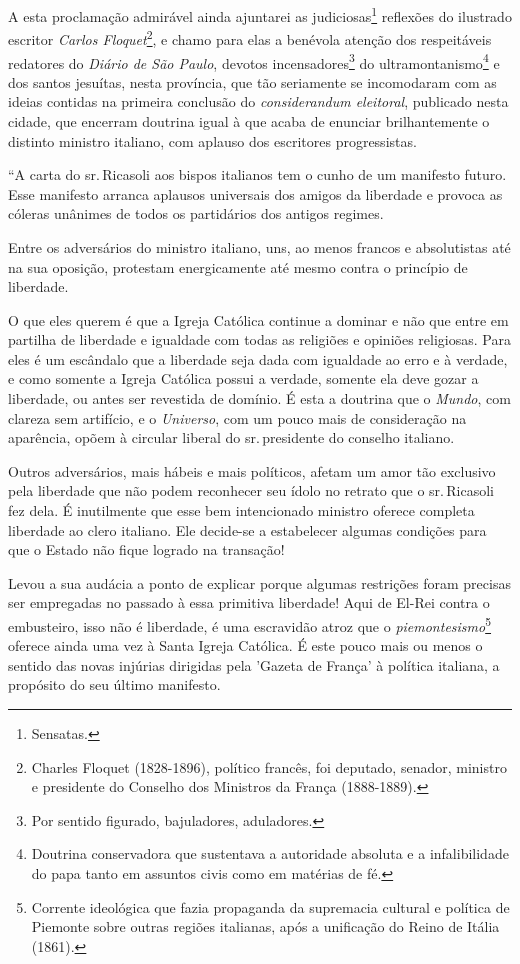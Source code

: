 A esta proclamação admirável ainda ajuntarei as judiciosas\footnote{
  Sensatas.} reflexões do ilustrado escritor \emph{Carlos
Floquet}\footnote{Charles Floquet (1828-1896), político francês, foi
  deputado, senador, ministro e presidente do Conselho dos Ministros da
  França (1888-1889).}, e chamo para elas a benévola atenção dos
respeitáveis redatores do \emph{Diário de São Paulo}, devotos
incensadores\footnote{Por sentido figurado, bajuladores, aduladores.}
do ultramontanismo\footnote{Doutrina conservadora que sustentava a
  autoridade absoluta e a infalibilidade do papa tanto em assuntos civis
  como em matérias de fé.}\label{ultramontano} e dos santos jesuítas, nesta província, que
tão seriamente se incomodaram com as ideias contidas na primeira
conclusão do \emph{considerandum eleitoral}, publicado nesta cidade, que
encerram doutrina igual à que acaba de enunciar brilhantemente o
distinto ministro italiano, com aplauso dos escritores progressistas.

``A carta do sr.\,Ricasoli aos bispos italianos tem o cunho de um
manifesto futuro. Esse manifesto arranca aplausos universais dos amigos
da liberdade e provoca as cóleras unânimes de todos os partidários dos
antigos regimes.

Entre os adversários do ministro italiano, uns, ao menos francos e
absolutistas até na sua oposição, protestam energicamente até mesmo
contra o princípio de liberdade.

O que eles querem é que a Igreja Católica continue a dominar e não que
entre em partilha de liberdade e igualdade com todas as religiões e
opiniões religiosas. Para eles é um escândalo que a liberdade seja dada
com igualdade ao erro e à verdade, e como somente a Igreja Católica
possui a verdade, somente ela deve gozar a liberdade, ou antes ser
revestida de domínio. É esta a doutrina que o \emph{Mundo}, com clareza
sem artifício, e o \emph{Universo}, com um pouco mais de consideração na
aparência, opõem à circular liberal do sr.\,presidente do conselho
italiano.

Outros adversários, mais hábeis e mais políticos, afetam um amor tão
exclusivo pela liberdade que não podem reconhecer seu ídolo no retrato
que o sr.\,Ricasoli fez dela. É inutilmente que esse bem intencionado
ministro oferece completa liberdade ao clero italiano. Ele decide-se a
estabelecer algumas condições para que o Estado não fique logrado na
transação!

Levou a sua audácia a ponto de explicar porque algumas restrições foram
precisas ser empregadas no passado à essa primitiva liberdade! Aqui de
El-Rei contra o embusteiro, isso não é liberdade, é uma escravidão atroz
que o \emph{piemontesismo}\footnote{Corrente ideológica que fazia
  propaganda da supremacia cultural e política de Piemonte sobre outras
  regiões italianas, após a unificação do Reino de Itália (1861).}
oferece ainda uma vez à Santa Igreja Católica. É este pouco mais ou
menos o sentido das novas injúrias dirigidas pela 'Gazeta de França' à
política italiana, a propósito do seu último manifesto.

